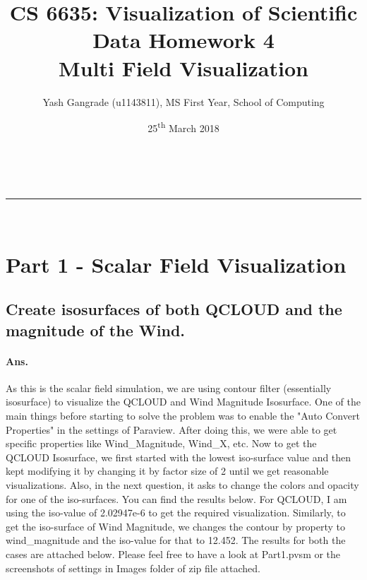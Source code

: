 \documentclass[a4paper,11pt]{article}
\makeatletter
\newcommand{\linia}{\rule{\linewidth}{0.5pt}}
\theoremstyle{mytheor}
\renewcommand{\maketitle}{
\begin{center}
\vspace{2ex}
{\huge \textsc{\@title}}
\vspace{1ex}
\\
\linia\\
\@author \hfill \@date
\vspace{4ex}
\end{center}
}
\makeatother
\begin{document}
\title{CS 6635: Visualization of Scientific Data Homework 4 \\ \large Multi Field Visualization}

\author{Yash Gangrade (u1143811), MS First Year, School of Computing}

\date{25\textsuperscript{th} March 2018}
\maketitle
\tableofcontents
\listoffigures
\null \clearpage

\section{Part 1 - Scalar Field Visualization}
\subsection{Create isosurfaces of both QCLOUD and the magnitude of the Wind.}
\paragraph{Ans.}
As this is the scalar field simulation, we are using contour filter (essentially isosurface) to visualize the QCLOUD and Wind Magnitude Isosurface. One of the main things before starting to solve the problem was to enable the "Auto Convert Properties" in the settings of Paraview. After doing this, we were able to get specific properties like Wind\_Magnitude, Wind\_X, etc. Now to get the QCLOUD Isosurface, we first started with the lowest iso-surface value and then kept modifying it by changing it by factor size of 2 until we get reasonable visualizations. Also, in the next question, it asks to change the colors and opacity for one of the iso-surfaces. You can find the results below. For QCLOUD, I am using the iso-value of 2.02947e-6 to get the required visualization. Similarly, to get the iso-surface of Wind Magnitude, we changes the contour by property to wind\_magnitude and the iso-value for that to 12.452. The results for both the cases are attached below. Please feel free to have a look at Part1.pvsm or the screenshots of settings in Images folder of zip file attached. 
\end{document}
